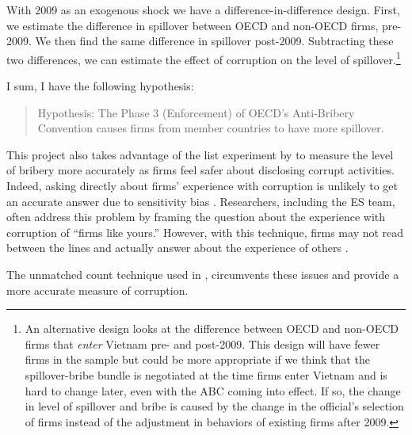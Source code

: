 With 2009 as an exogenous shock we have a difference-in-difference design. First, we estimate the difference in spillover between OECD and non-OECD firms, pre-2009. We then find the same difference in spillover post-2009. Subtracting these two differences, we can estimate the effect of corruption on the level of spillover.\footnote{An alternative design looks at the difference between OECD and non-OECD firms that \textit{enter} Vietnam pre- and post-2009. This design will have fewer firms in the sample but could be more appropriate if we think that the spillover-bribe bundle is negotiated at the time firms enter Vietnam and is hard to change later, even with the ABC coming into effect. If so, the change in level of spillover and bribe is caused by the change in the official's selection of firms instead of the adjustment in behaviors of existing firms after 2009.}

I sum, I have the following hypothesis:

\begin{quote}
Hypothesis: The Phase 3 (Enforcement) of OECD's Anti-Bribery Convention causes firms from member countries to have more spillover.
\end{quote}

This project also takes advantage of the list experiment by \citet{Malesky2015} to measure the level of bribery more accurately as firms feel safer about disclosing corrupt activities. Indeed, asking directly about firms' experience with corruption is unlikely to get an accurate answer due to sensitivity bias \citep{Coutts2011}. Researchers, including the ES team, often address this problem by framing the question about the experience with corruption of ``firms like yours.'' However, with this technique, firms may not read between the lines and actually answer about the experience of others \citep{Ahart2004}.

The unmatched count technique used in \citet{Malesky2015}, circumvents these issues and provide a more accurate measure of corruption.